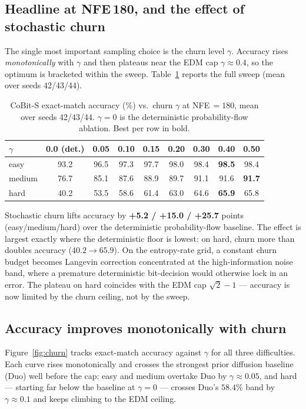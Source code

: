 \documentclass[11pt]{article}
\newcommand{\best}[1]{\textbf{#1}}
\begin{document}
\subsection{Headline at NFE\,180, and the effect of stochastic churn}

The single most important sampling choice is the churn level $\gamma$. Accuracy rises \emph{monotonically}
with $\gamma$ and then plateaus near the EDM cap $\gamma\approx0.4$, so the optimum is bracketed within the
sweep. Table~\ref{tab:churn} reports the full sweep (mean over seeds 42/43/44).

\begin{table}[h]
\centering
\caption{CoBit-S exact-match accuracy (\%) vs.\ churn $\gamma$ at NFE\,$=180$, mean over seeds 42/43/44.
$\gamma{=}0$ is the deterministic probability-flow ablation. Best per row in bold.}
\label{tab:churn}
\small
\begin{tabular}{l c c c c c c c c}
\toprule
$\gamma$ & 0.0 (det.) & 0.05 & 0.10 & 0.15 & 0.20 & 0.30 & 0.40 & 0.50\\
\midrule
easy   & 93.2 & 96.5 & 97.3 & 97.7 & 98.0 & 98.4 & \best{98.5} & 98.4\\
medium & 76.7 & 85.1 & 87.6 & 88.9 & 89.7 & 91.1 & 91.6 & \best{91.7}\\
hard   & 40.2 & 53.5 & 58.6 & 61.4 & 63.0 & 64.6 & \best{65.9} & 65.8\\
\bottomrule
\end{tabular}
\end{table}

\noindent Stochastic churn lifts accuracy by \textbf{+5.2 / +15.0 / +25.7} points (easy/medium/hard) over
the deterministic probability-flow baseline. The effect is largest exactly where the deterministic floor is
lowest: on hard, churn more than doubles accuracy ($40.2\to65.9$). On the entropy-rate grid, a constant
churn budget becomes Langevin correction concentrated at the high-information noise band, where a premature
deterministic bit-decision would otherwise lock in an error. The plateau on hard coincides with the EDM cap
$\sqrt2-1$ --- accuracy is now limited by the churn ceiling, not by the sweep.

\subsection{Accuracy improves monotonically with churn}

Figure~\ref{fig:churn} tracks exact-match accuracy against $\gamma$ for all three difficulties. Each curve
rises monotonically and crosses the strongest prior diffusion baseline (Duo) well before the cap: easy and
medium overtake Duo by $\gamma\approx0.05$, and hard --- starting far below the baseline at $\gamma{=}0$ ---
crosses Duo's $58.4\%$ band by $\gamma\approx0.1$ and keeps climbing to the EDM ceiling.
\end{document}
